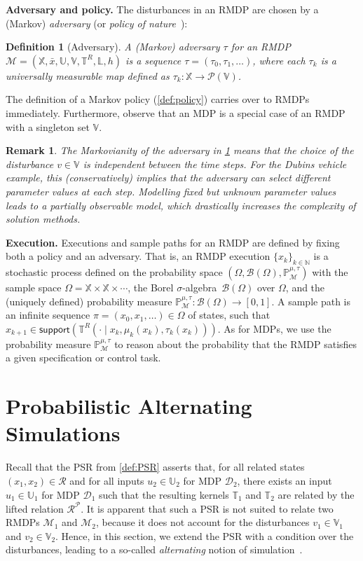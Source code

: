 \documentclass[letterpaper, 10 pt, conference]{ieeeconf}  %
\newtheorem{definition}{Definition}
\newtheorem{remark}{Remark}
\newcommand*{\policy}{\ensuremath{\mu}}
\newcommand*{\States}{\ensuremath{\mathbb{X}}}
\newcommand*{\Actions}{\ensuremath{\mathbb{U}}}
\newcommand*{\Disturb}{\ensuremath{\mathbb{V}}}
\newcommand*{\Labels}{\ensuremath{\mathbb{L}}}
\newcommand*{\initState}{\ensuremath{\bar{x}}}
\newcommand*{\transfunc}{\ensuremath{\mathbb{T}}}
\newcommand*{\transfuncR}{\ensuremath{\mathbb{T}^R}}
\newcommand*{\labelfunc}{\ensuremath{h}}
\newcommand*{\mdp}{\ensuremath{\mathcal{D}}}
\newcommand*{\rmdp}{{\ensuremath{\mathcal{M}}}}
\newcommand*{\RMDP}{\ensuremath{\tuple{\States,\initState,\Actions,\Disturb,\transfuncR,\Labels,\labelfunc}}}
\newcommand*{\adversary}{\ensuremath{\tau}}
\newcommand*{\NN}{\mathbb{N}}
\newcommand*{\tuple}[1]{\left(#1\right)}
\newcommand*{\support}[1]{\textsf{support}(#1)}
\newcommand*{\Relation}{\mathcal{R}}
\newcommand*{\liftRelation}{\mathcal{R}^\mathcal{P}}
\newcommand*{\Prob}{\mathbb{P}}
\newcommand*{\distr}[1]{\mathcal{P}(#1)}
\newcommand*{\Borel}[1]{\ensuremath{\mathcal{B}(#1)}}
\begin{document}
\textbf{Adversary and policy.}
The disturbances in an RMDP are chosen by a (Markov) \emph{adversary} (or \emph{policy of nature}~\cite{DBLP:journals/ior/NilimG05}):

\begin{definition}[Adversary]
    \label{def:adversary}
    A (Markov) adversary $\adversary$ for an RMDP $\rmdp = \RMDP$ is a sequence $\adversary = (\adversary_0, \adversary_1, \ldots)$, where each $\adversary_k$ is a universally measurable map defined as $\adversary_k \colon \States \to \distr{\Disturb}$.
\end{definition}

The definition of a Markov policy (\cref{def:policy}) carries over to RMDPs immediately.
Furthermore, observe that an MDP is a special case of an RMDP with a singleton set $\Disturb$.

\begin{remark}
    The Markovianity of the adversary in \cref{def:adversary} means that the choice of the disturbance $v \in \Disturb$ is independent between the time steps.
    For the Dubins vehicle example, this (conservatively) implies that the adversary can select different parameter values at each step.
    Modelling fixed but unknown parameter values leads to a partially observable model, which drastically increases the complexity of solution methods.
\end{remark}

\textbf{Execution.}
Executions and sample paths for an RMDP are defined by fixing both a policy and an adversary.
That is, an RMDP execution $\{ x_k \}_{k \in \NN}$ is a stochastic process defined on the probability space $(\Omega, \Borel{\Omega}, \Prob_{\rmdp}^{\policy,\adversary})$ with the sample space $\Omega = \States \times \States \times \cdots$, the Borel $\sigma$-algebra~$\Borel{\Omega}$ over $\Omega$, and the (uniquely defined) probability measure $\Prob_{\rmdp}^{\policy,\adversary} \colon \Borel{\Omega} \to [0,1]$.
A sample path is an infinite sequence $\pi = (x_0, x_1, \ldots) \in \Omega$ of states, such that $x_{k+1} \in \support{\transfuncR(\cdot \mid x_k, \policy_k(x_k), \adversary_k(x_k))}$. 
As for MDPs, we use the probability measure $\Prob_{\rmdp}^{\policy,\adversary}$ to reason about the probability that the RMDP satisfies a given specification or control task.

\section{Probabilistic Alternating Simulations}
\label{sec:PASR}
Recall that the PSR from \cref{def:PSR} asserts that, for all related states $(x_1, x_2) \in \Relation$ and for all inputs $u_2 \in \Actions_2$ for MDP $\mdp_2$, there exists an input $u_1 \in \Actions_1$ for MDP $\mdp_1$ such that the resulting kernels $\transfunc_1$ and $\transfunc_2$ are related by the lifted relation $\liftRelation$.
It is apparent that such a PSR is not suited to relate two RMDPs $\rmdp_1$ and $\rmdp_2$, because it does not account for the disturbances $v_1 \in \Disturb_1$ and $v_2 \in \Disturb_2$.
Hence, in this section, we extend the PSR with a condition over the disturbances, leading to a so-called \emph{alternating} notion of simulation~\cite{DBLP:conf/concur/AlurHKV98}.
\end{document}
